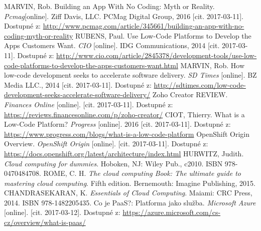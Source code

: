 \begin{thebibliography}{99}

MARVIN, Rob. Building an App With No Coding: Myth or Reality.
\textit{Pcmag}[online].
 Ziff Davis, LLC. PCMag Digital Group, 2016 [cit. 2017-03-11]. Dostupné z: \url{http://www.pcmag.com/article/345661/building-an-app-with-no-coding-myth-or-reality}
RUBENS, Paul. Use Low-Code Platforms to Develop the Apps Customers Want.
\textit{CIO} [online].
IDG Communications, 2014 [cit. 2017-03-11]. Dostupné z: \url{http://www.cio.com/article/2845378/development-tools/use-low-code-platforms-to-develop-the-apps-customers-want.html}
MARVIN, Rob. How low-code development seeks to accelerate software delivery.
\textit{SD Times} [online].
BZ Media LLC., 2014 [cit. 2017-03-11]. Dostupné z: \url{http://sdtimes.com/low-code-development-seeks-accelerate-software-delivery/}
Zoho Creator REVIEW.
\textit{Finances Online} [online].
[cit. 2017-03-11]. Dostupné z: \url{https://reviews.financesonline.com/p/zoho-creator/}
CIOT, Thierry. What is a Low-Code Platform?
\textit{Progress} [online].
2016 [cit. 2017-03-11]. Dostupné z: \url{https://www.progress.com/blogs/what-is-a-low-code-platform}
OpenShift Origin Overview.
\textit{OpenShift Origin} [online].
[cit. 2017-03-11]. Dostupné z: \url{https://docs.openshift.org/latest/architecture/index.html}
HURWITZ, Judith.
\textit{Cloud computing for dummies}.
Hoboken, NJ: Wiley Pub., c2010. ISBN 978-0470484708.
ROME, C. H.
\textit{The cloud computing Book: The ultimate guide to mastering cloud computing}.
Fifth edition. Bernemouth: Imagine Publishing, 2015.
CHANDRASEKARAN, K.
\textit{Essentials of Cloud Computing}.
Maiami: CRC Press, 2014. ISBN 978-1482205435.
Co je PaaS?: Platforma jako služba.
\textit{Microsoft Azure} [online].
[cit. 2017-03-12]. Dostupné z: \url{https://azure.microsoft.com/cs-cz/overview/what-is-paas/}


\end{thebibliography}
